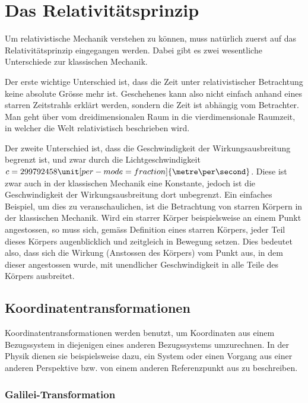 
\section{Das Relativitätsprinzip 
\label{relativ:section:relativistik}}

Um relativistische Mechanik verstehen zu können,
muss natürlich zuerst auf das Relativitätsprinzip eingegangen werden.
Dabei gibt es zwei wesentliche Unterschiede zur klassischen Mechanik.

Der erste wichtige Unterschied ist, dass die Zeit unter relativistischer Betrachtung keine absolute Grösse mehr ist.
Geschehenes kann also nicht einfach anhand eines starren Zeitstrahls erklärt werden, sondern die Zeit ist abhängig vom Betrachter.
Man geht über vom dreidimensionalen Raum in die vierdimensionale Raumzeit, in welcher die Welt relativistisch beschrieben wird.

Der zweite Unterschied ist,
dass die Geschwindigkeit der Wirkungsausbreitung begrenzt ist,
und zwar durch die Lichtgeschwindigkeit
\(c=299792458\unit[per-mode = fraction]{\metre\per\second}\).
Diese ist zwar auch in der klassischen Mechanik eine Konstante,
jedoch ist die Geschwindigkeit der Wirkungsausbreitung dort unbegrenzt.
Ein einfaches Beispiel, um dies zu veranschaulichen,
ist die Betrachtung von starren Körpern in der klassischen Mechanik.
Wird ein starrer Körper beispielsweise an einem Punkt angestossen,
so muss sich, gemäss Definition eines starren Körpers,
jeder Teil dieses Körpers augenblicklich und zeitgleich in Bewegung setzen.
Dies bedeutet also, dass sich die Wirkung (Anstossen des Körpers)
vom Punkt aus, in dem dieser angestossen wurde,
mit unendlicher Geschwindigkeit in alle Teile des Körpers ausbreitet.


\subsection{Koordinatentransformationen 
\label{relativ:section:koordtrafo}}

Koordinatentransformationen werden benutzt,
um Koordinaten aus einem Bezugssystem in diejenigen eines anderen Bezugssystems umzurechnen.
In der Physik dienen sie beispielsweise dazu,
ein System oder einen Vorgang aus einer anderen Perspektive bzw.
von einem anderen Referenzpunkt aus zu beschreiben.

\subsubsection{Galilei-Transformation 
\label{relativ:section:galilei-trafo}}

